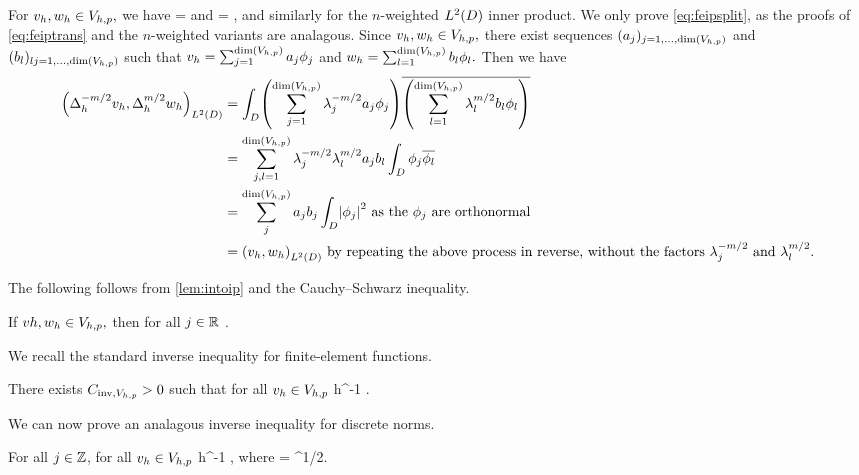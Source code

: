 \label{lem:intoip}
For $v_{h}, w_{h} \in V_{h,p},$ we have
\beq\label{eq:feipsplit}
\IPLtD{\Deltahmmt \vh}{\Deltahmt \wh} = \IPLtD{\vh}{\wh}
\eeq
and
\beq\label{eq:feiptrans}
\IPLtD{\Deltahmt \vh}{\Deltahmt \vh} =  ,
\eeq
and similarly for the $n$-weighted $\LtD$ inner product.
\ele
{}
We only prove \cref{eq:feipsplit}, as the proofs of \cref{eq:feiptrans} and the $n$-weighted variants are analagous. Since $v_{h},w_{h} \in V_{h,p},$ there exist sequences $(\aj)_{j =1,\ldots,\dimVhp}$ and $(\bsl)_{l j =1,\ldots,\dimVhp}$ such that $\vh = \sum_{j=1}^{\dimVhp} \aj\phij$ and $\wh = \sum_{l=1}^{\dimVhp} \bsl \phil.$ Then we have
\begin{align*}
\IPLtD{\Deltahmmt \vh}{\Deltahmt \wh} &= \int_D \mleft(\sum_{j=1}^{\dimVhp}\lambdaj^{-m/2} \aj\phij\mright)\overline{\mleft(\sum_{l=1}^{\dimVhp} \lambdal^{m/2}\bsl \phil\mright)}\\
&= \sum_{j,l=1}^{\dimVhp} \lambdaj^{-m/2} \lambdal^{m/2} \aj \bsl \int_D \phij \philbar\\
& =\sum_{j}^{\dimVhp} \aj \bsj \int_D \abs{\phij}^2 \text{ as the } \phij \text{ are orthonormal}\\
&= \IPLtD{\vh}{\wh} \text{ by repeating the above process in reverse, without the factors } \lambdaj^{-m/2} \tand \lambdal^{m/2}.
\end{align*}
\epf

The following  follows from \cref{lem:intoip} and the Cauchy--Schwarz inequality.

\label{cor:ipdiscbound}
If $vh, w_{h} \in V_{h,p},$ then for all $j \in \mathbb R$
\beqs
\IPLtD{\vh}{\wh} \leq \Njh{\vh}\Nmjh{\wh}.
\eeqs
\eco

We recall the standard inverse inequality for finite-element functions.

\label{lem:inverseinequality}
There exists $C_{\mathrm{inv},V_{h,p}} > 0$ such that for all $v_{h} \in V_{h,p}$
\beqs
\NHoD{\vh} \leq \CinvVhp h^{-1} \NLtD{\vh}.
\eeqs
\ele

We can now prove an analagous inverse inequality for discrete norms.

\label{lem:inversediscrete}
For all $j \in \mathbb Z$, for all $v_{h} \in V_{h,p}$
\beqs
\Njh{\vh} \leq \Chinv h^{-1} \Njmoh{\vh},
\eeqs
where
\beqs
\Chinv = \CinvVhp {}^{1/2}.
\eeqs
\ele

